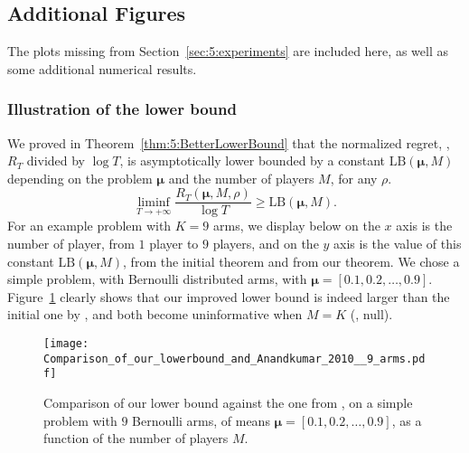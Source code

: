 \subsection{Additional Figures}
\label{app:5:moreplots}

The plots missing from Section~\ref{sec:5:experiments} are included here,
as well as some additional numerical results.


\subsubsection{Illustration of the lower bound}
\label{app:5:illustrationLowerBound}


We proved in Theorem~\ref{thm:5:BetterLowerBound} that the normalized regret, \ie, $R_T$ divided by
$\log T$, is asymptotically lower bounded by a constant $\mathrm{LB}(\boldsymbol{\mu}, M)$
depending on the problem $\boldsymbol{\mu}$ and the number of players $M$, for any $\rho$.
\begin{equation}
  \mathop{\lim\inf}\limits_{T \to +\infty} \frac{R_T(\boldsymbol{\mu}, M, \rho)}{\log T} \geq \mathrm{LB}(\boldsymbol{\mu}, M).
\end{equation}
%
For an example problem with $K = 9$ arms, we display below on the $x$ axis is
the number of player, from $1$ player to $9$ players, and on the
$y$ axis is the value of this constant $\mathrm{LB}(\boldsymbol{\mu}, M)$, from the initial
theorem and from our theorem.
We chose a simple problem, with Bernoulli
distributed arms, with $\boldsymbol{\mu} = [0.1, 0.2, \dots, 0.9]$.
%
Figure~\ref{fig:5:CompLowerBounds} clearly shows that our improved lower bound is indeed larger than the initial one by \cite{Zhao10},
and both become uninformative when $M=K$ (\ie, null).

\begin{figure}[h!]
  \centering
  \texttt{[image: Comparison\_of\_our\_lowerbound\_and\_Anandkumar\_2010\_\_9\_arms.pdf]}
  \caption[Comparison of our lower bound against the one from \cite{Zhao10}]{Comparison of our lower bound against the one from \cite{Zhao10}, on a simple problem with $9$ Bernoulli arms, of means $\boldsymbol{\mu} = [0.1, 0.2, \dots, 0.9]$, as a function of the number of players $M$.}
  \label{fig:5:CompLowerBounds}
\end{figure}


